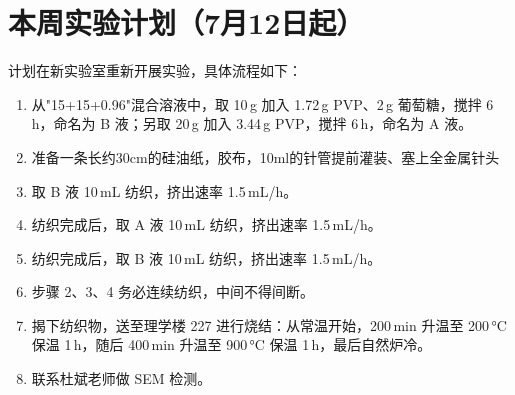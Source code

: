 
\section{本周实验计划（7月12日起）}

计划在新实验室重新开展实验，具体流程如下：

\begin{enumerate}
  \item 从"15+15+0.96"混合溶液中，取 10\,g 加入 1.72\,g PVP、2\,g 葡萄糖，搅拌 6\,h，命名为 B 液；另取 20\,g 加入 3.44\,g PVP，搅拌 6\,h，命名为 A 液。
  \item 准备一条长约30cm的硅油纸，胶布，10ml的针管提前灌装、塞上全金属针头
  \item 取 B 液 10\,mL 纺织，挤出速率 1.5\,mL/h。
  \item 纺织完成后，取 A 液 10\,mL 纺织，挤出速率 1.5\,mL/h。
  \item 纺织完成后，取 B 液 10\,mL 纺织，挤出速率 1.5\,mL/h。
  \item 步骤 2、3、4 务必连续纺织，中间不得间断。
  \item 揭下纺织物，送至理学楼 227 进行烧结：从常温开始，200\,min 升温至 200\,°C 保温 1\,h，随后 400\,min 升温至 900\,°C 保温 1\,h，最后自然炉冷。
  \item 联系杜斌老师做 SEM 检测。
\end{enumerate}
